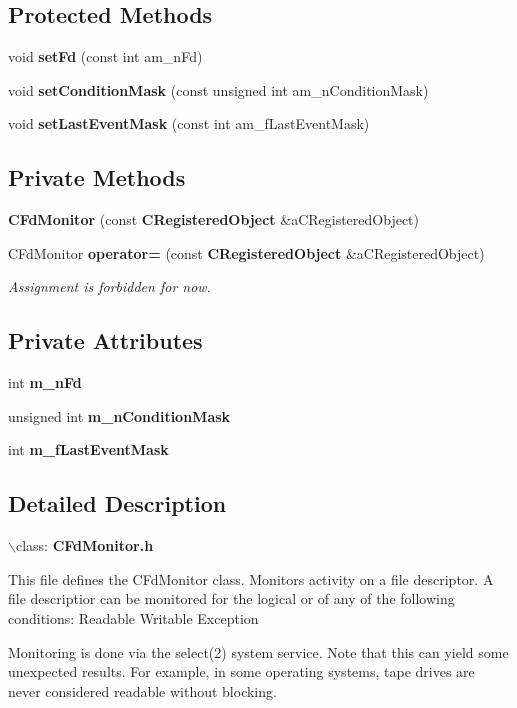 \subsection*{Protected Methods}
\begin{CompactItemize}
\item 
void {\bf set\-Fd} (const int am\_\-n\-Fd)
\item 
void {\bf set\-Condition\-Mask} (const unsigned int am\_\-n\-Condition\-Mask)
\item 
void {\bf set\-Last\-Event\-Mask} (const int am\_\-f\-Last\-Event\-Mask)
\end{CompactItemize}
\subsection*{Private Methods}
\begin{CompactItemize}
\item 
{\bf CFd\-Monitor} (const {\bf CRegistered\-Object} \&a\-CRegistered\-Object)
\item 
CFd\-Monitor {\bf operator=} (const {\bf CRegistered\-Object} \&a\-CRegistered\-Object)
\begin{CompactList}\small\item\em Assignment is forbidden for now.\item\end{CompactList}\end{CompactItemize}
\subsection*{Private Attributes}
\begin{CompactItemize}
\item 
int {\bf m\_\-n\-Fd}
\item 
unsigned int {\bf m\_\-n\-Condition\-Mask}
\item 
int {\bf m\_\-f\-Last\-Event\-Mask}
\end{CompactItemize}


\subsection{Detailed Description}
$\backslash$class: {\bf CFd\-Monitor.h}

This file defines the CFd\-Monitor class. Monitors activity on a file descriptor. A file descriptior can be  monitored for the logical or of any of the following conditions: Readable Writable Exception

Monitoring is done via the select(2) system service. Note that this can yield some unexpected results. For example, in some operating systems, tape drives are never considered readable without blocking.

